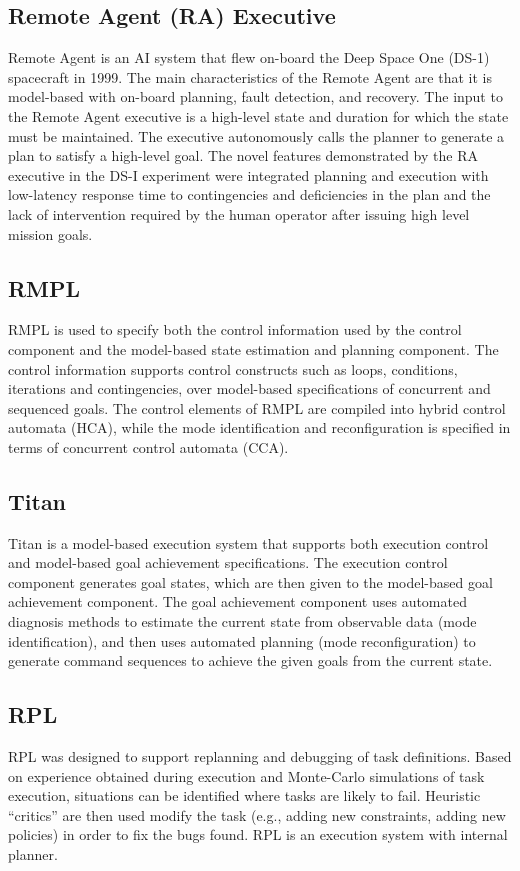\documentclass[conference]{IEEEtran}
\begin{document}
\subsection{\textbf{Remote Agent (RA) Executive}}\label{sec:ra}
Remote Agent is an AI system that flew on-board the Deep Space One (DS-1) spacecraft in 1999. The main characteristics of the Remote Agent are that it is model-based with on-board planning, fault detection, and recovery. The input to the Remote Agent executive is a high-level state and duration for which the state must be maintained. The executive autonomously calls the planner to generate a plan to satisfy a high-level goal. The novel features demonstrated by the RA executive in the DS-I experiment were integrated planning and execution with low-latency response time to contingencies and deficiencies in the plan and the lack of intervention required by the human operator after issuing high level mission goals. 

\subsection{\textbf{RMPL}}\label{sec:rmpl}
RMPL is used to specify both the control information used by the control component and the model-based state estimation and planning component. The control information supports control constructs such as loops, conditions, iterations and contingencies, over model-based specifications of concurrent and sequenced goals. The control elements of RMPL are compiled into hybrid control automata (HCA), while the mode identification and reconfiguration is specified in terms of concurrent control automata (CCA).

\subsection{\textbf{Titan}}\label{sec:titan}
Titan is a model-based execution system that supports both execution control and model-based goal achievement specifications. The execution control component generates goal states, which are then given to the model-based goal achievement component. The goal achievement component uses automated diagnosis methods to estimate the current state from observable data (mode identification), and then uses automated planning (mode reconfiguration) to generate command sequences to achieve the given goals from the current state.

\subsection{\textbf{RPL}}\label{sec:rpl}
RPL was designed to support replanning and debugging of task definitions. Based on experience obtained during execution and Monte-Carlo simulations of task execution, situations can be identified where tasks are likely to fail. Heuristic “critics” are then used modify the task (e.g., adding new constraints, adding new policies) in order to fix the bugs found. RPL is an execution system with internal planner.
\end{document}

